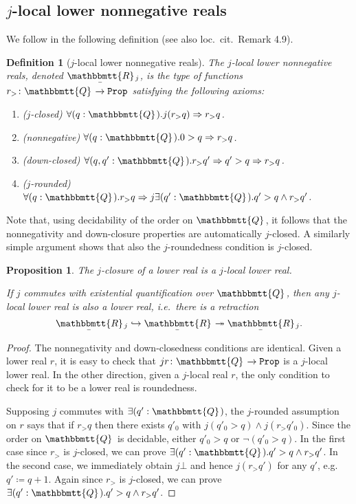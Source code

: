 \documentclass[reqno,11pt]{amsproc}
\theoremstyle{plain}
\newtheorem{proposition}[theorem]{Proposition}
\newtheorem{definition}[theorem]{Definition}
\theoremstyle{definition}
\newcommand{\Const}[1]{\mathtt{#1}}
\renewcommand{\to}[1][]{\xrightarrow{#1}}
\newcommand{\surj}{\twoheadrightarrow}
\newcommand{\inj}{\hookrightarrow}
\newcommand{\ubar}[1]{\underaccent{\bar}{#1}}
\newcommand{\internal}[1]{\raisebox{-.03ex}{$\mathbbmtt{#1}$}}
\newcommand{\hs}{\hspace{1pt}}
\newcommand{\tqq}{\internal{Q}\hs}
\newcommand{\trr}{\internal{R}}
\newcommand{\tlrr}{\ubar{\trr}\hs}
\newcommand{\prop}{\Const{Prop}}
\newcommand{\imp}{\Rightarrow}
\numberwithin{equation}{section}
\begin{document}
\subsection{$j$-local lower nonnegative reals}

We follow \cite[Definition 4.21]{schultz2019temporal} in the following definition (see also loc.\ cit.\ Remark 4.9).

\begin{definition}[$j$-local lower nonnegative reals]\label{def.j_loc_lower_reals}
The \emph{$j$-local lower nonnegative reals}, denoted $\tlrr_j$, is the type of functions $r_>\colon\tqq\to\prop$ satisfying the following axioms:
\begin{enumerate}[start=0]
	\item ($j$-closed) $\forall(q:\tqq).j(r_>q)\imp r_>q$.
	\item (nonnegative) $\forall(q:\tqq).0>q\imp r_>q$.
	\item (down-closed) $\forall(q,q':\tqq). r_>q'\imp q'>q\imp r_>q$.
	\item ($j$-rounded) $\forall (q:\tqq).r_>q\imp j\exists (q':\tqq).q'>q\wedge r_>q'$.
\end{enumerate}
\end{definition}

Note that, using decidability of the order on $\tqq$, it follows that the nonnegativity and down-closure properties are automatically $j$-closed. A similarly simple argument shows that also the $j$-roundedness condition is $j$-closed.

\begin{proposition}
The $j$-closure of a lower real is a $j$-local lower real.

If $j$ commutes with existential quantification over $\tqq$, then any $j$-local lower real is also a lower real, i.e.\ there is a retraction
\[
  \tlrr_j\inj\tlrr\surj\tlrr_j.
\]
\end{proposition}
\begin{proof}
The nonnegativity and down-closedness conditions are identical. Given a lower real $r$, it is easy to check that $jr\colon\tqq\to\prop$ is a $j$-local lower real. In the other direction, given a $j$-local real $r$, the only condition to check for it to be a lower real is roundedness. 

Supposing $j$ commutes with $\exists(q':\tqq)$, the $j$-rounded assumption on $r$ says that if $r_>q$ then there exists $q'_0$ with $j(q'_0>q)\wedge j(r_>q'_0)$. Since the order on $\tqq$ is decidable, either $q'_0>q$ or $\neg(q'_0>q)$. In the first case since $r_>$ is $j$-closed, we can prove $\exists (q':\tqq).q'>q\wedge r_>q'$. In the second case, we immediately obtain $j\bot$ and hence $j(r_>q')$ for any $q'$, e.g.\ $q'\coloneqq q+1$. Again since $r_>$ is $j$-closed, we can prove $\exists (q':\tqq).q'>q\wedge r_>q'$.
\end{proof}
\end{document}
